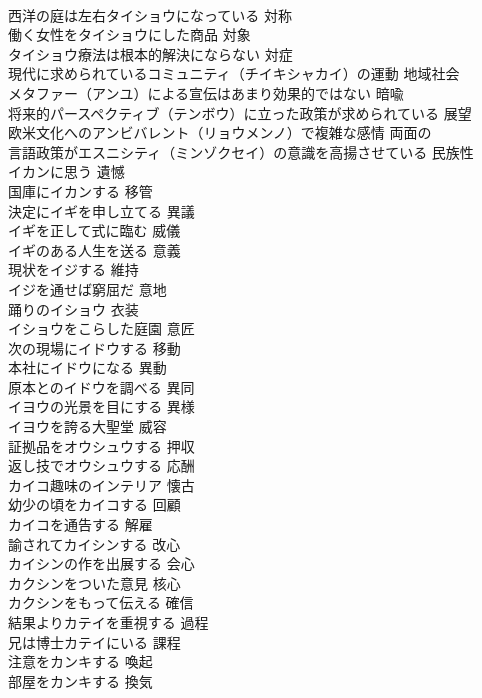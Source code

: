 \documentclass[8pt]{extreport}
\begin{document}
\begin{CJK}{UTF8}{min}
\\	西洋の庭は左右タイショウになっている	対称
\\	働く女性をタイショウにした商品	対象
\\	タイショウ療法は根本的解決にならない	対症
\\	現代に求められているコミュニティ（チイキシャカイ）の運動	地域社会
\\	メタファー（アンユ）による宣伝はあまり効果的ではない	暗喩
\\	将来的パースペクティブ（テンボウ）に立った政策が求められている	展望
\\	欧米文化へのアンビバレント（リョウメンノ）で複雑な感情	両面の
\\	言語政策がエスニシティ（ミンゾクセイ）の意識を高揚させている	民族性
\\	イカンに思う	遺憾
\\	国庫にイカンする	移管
\\	決定にイギを申し立てる	異議
\\	イギを正して式に臨む	威儀
\\	イギのある人生を送る	意義
\\	現状をイジする	維持
\\	イジを通せば窮屈だ	意地
\\	踊りのイショウ	衣装
\\	イショウをこらした庭園	意匠
\\	次の現場にイドウする	移動
\\	本社にイドウになる	異動
\\	原本とのイドウを調べる	異同
\\	イヨウの光景を目にする	異様
\\	イヨウを誇る大聖堂	威容
\\	証拠品をオウシュウする	押収
\\	返し技でオウシュウする	応酬
\\	カイコ趣味のインテリア	懐古
\\	幼少の頃をカイコする	回顧
\\	カイコを通告する	解雇
\\	諭されてカイシンする	改心
\\	カイシンの作を出展する	会心
\\	カクシンをついた意見	核心
\\	カクシンをもって伝える	確信
\\	結果よりカテイを重視する	過程
\\	兄は博士カテイにいる	課程
\\	注意をカンキする	喚起
\\	部屋をカンキする	換気

\end{CJK}
\end{document}
